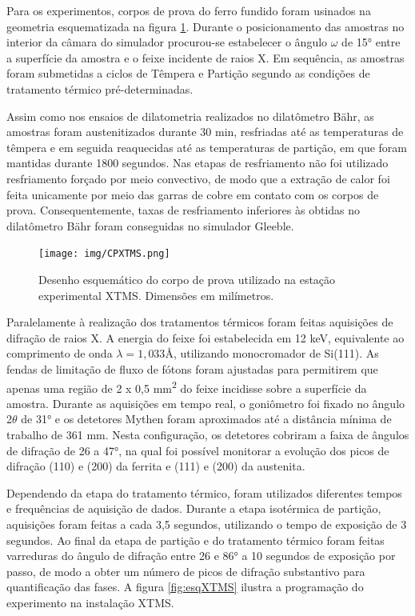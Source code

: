 Para os experimentos, corpos de prova do ferro fundido foram usinados na geometria esquematizada na figura \ref{fig:CPXTMS}. Durante o posicionamento das amostras no interior da câmara do simulador procurou-se estabelecer o ângulo $\omega$ de 15° entre a superfície da amostra e o feixe incidente de raios X. Em sequência, as amostras foram submetidas a ciclos de Têmpera e Partição segundo as condições de tratamento térmico pré-determinadas.


Assim como nos ensaios de dilatometria realizados no dilatômetro Bähr, as amostras foram austenitizados durante 30 min, resfriadas até as temperaturas de têmpera e em seguida reaquecidas até as temperaturas de partição, em que foram mantidas durante 1800 segundos. Nas etapas de resfriamento não foi utilizado resfriamento forçado por meio convectivo, de modo que a extração de calor foi feita unicamente por meio das garras de cobre em contato com os corpos de prova. Consequentemente, taxas de resfriamento inferiores às obtidas no dilatômetro Bähr foram conseguidas no simulador Gleeble.

\begin{figure}
	\texttt{[image: img/CPXTMS.png]}
	\caption{Desenho esquemático do corpo de prova utilizado na estação experimental XTMS. Dimensões em  milímetros.}
	\label{fig:CPXTMS}
\end{figure}

Paralelamente à realização dos tratamentos térmicos foram feitas aquisições de difração de raios X. A energia do feixe foi estabelecida em 12 keV, equivalente ao comprimento de onda $\lambda = 1,033\text{\AA}$, utilizando monocromador de Si(111). As fendas de limitação de fluxo de fótons foram ajustadas para permitirem que apenas uma região de 2 x 0,5 mm\textsuperscript{2} do feixe incidisse sobre a superfície da amostra. Durante as aquisições em tempo real, o goniômetro foi fixado no ângulo 2$\theta$ de 31° e os detetores Mythen foram aproximados até a distância mínima de trabalho de 361 mm. Nesta configuração, os detetores cobriram a faixa de ângulos de difração de 26 a 47°, na qual foi possível monitorar a evolução dos picos de difração (110) e (200) da ferrita e (111) e (200) da austenita.


Dependendo da etapa do tratamento térmico, foram utilizados diferentes tempos e frequências de aquisição de dados. Durante a etapa isotérmica de partição, aquisições foram feitas a cada 3,5 segundos, utilizando o tempo de exposição de 3 segundos. Ao final da etapa de partição e do tratamento térmico foram feitas varreduras do ângulo de difração entre 26 e 86° a 10 segundos de exposição por passo, de modo a obter um número de picos de difração substantivo para quantificação das fases. A figura \ref{fig:esqXTMS} ilustra a programação do experimento na instalação XTMS.

